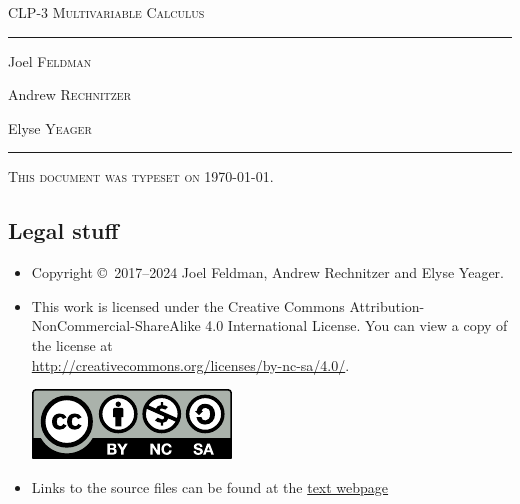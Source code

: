 \documentclass[12pt,letterpaper, openany]{book}
\begin{document}
\setcounter{page}{0}

\begin{titlepage}
\begin{center}
\textsc{\LARGE
CLP-3 Multivariable Calculus
}\\[2ex]

\vspace{5ex}
\hrule
\vspace{5ex}

\begin{minipage}[t]{0.3\textwidth} \begin{flushleft}
\large Joel \textsc{Feldman}
\end{flushleft} \end{minipage}%
\begin{minipage}[t]{0.3\textwidth} \begin{flushleft}
\large Andrew \textsc{Rechnitzer}
\end{flushleft} \end{minipage}%
\begin{minipage}[t]{0.3\textwidth} \begin{flushright}
\large Elyse \textsc{Yeager}
\end{flushright} \end{minipage}%
\end{center}
\vspace{2ex}
\hrule

\vfill
\textsc{This document was typeset on \today.}
\end{titlepage}

\subsection*{Legal stuff}
\begin{itemize}
 \item Copyright \copyright\ 2017--2024 Joel Feldman, Andrew Rechnitzer and Elyse Yeager.
\item This work is licensed under the
Creative Commons Attribution-NonCommercial-ShareAlike 4.0 International
License. You can view a copy of the license at \\
\url{http://creativecommons.org/licenses/by-nc-sa/4.0/}.
\begin{center}
 \includegraphics{by-nc-sa.pdf}
\end{center}
\item Links to the source files can be found at the \href{http://www.math.ubc.ca/~CLP/index.html}{text webpage}
\end{itemize}
\end{document}
